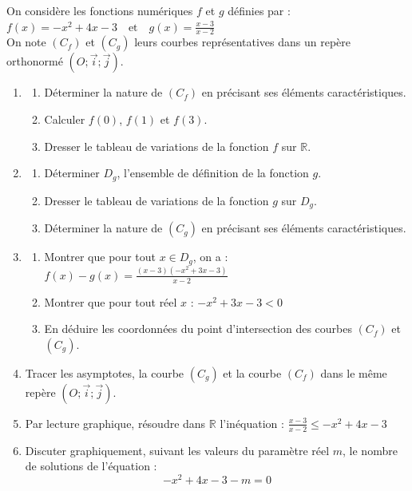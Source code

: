 \begin{Exercice}
On considère les fonctions numériques $f$ et $g$ définies par : \quad
$f(x) = -x^2 + 4x - 3  \quad \text{et} \quad  g(x) = \frac{x-3}{x-2}$
\vspace{0.2cm} \\
On note $(C_f)$ et $(C_g)$ leurs courbes représentatives dans un repère orthonormé $(O;\vec{i};\vec{j})$.

\begin{enumerate}
\item
\begin{enumerate}
    \item Déterminer la nature de $(C_f)$ en précisant ses éléments caractéristiques.
    \item Calculer $f(0)$, $f(1)$ et $f(3)$.
    \item Dresser le tableau de variations de la fonction $f$ sur $\mathbb{R}$.
\end{enumerate}
\item
\begin{enumerate}
    \item Déterminer $D_g$, l'ensemble de définition de la fonction $g$.
    \item Dresser le tableau de variations de la fonction $g$ sur $D_g$.
    \item Déterminer la nature de $(C_g)$ en précisant ses éléments caractéristiques.
\end{enumerate}
\item
\begin{enumerate}
    \item Montrer que pour tout $x \in D_g$, on a :
    $f(x) - g(x) = \frac{(x-3)(-x^2+3x-3)}{x-2}$
    \item Montrer que pour tout réel $x$ : $-x^2+3x-3 < 0 $
    \item En déduire les coordonnées du point d'intersection des courbes $(C_f)$ et $(C_g)$.
\end{enumerate}
\item Tracer les asymptotes, la courbe $(C_g)$ et la courbe $(C_f)$ dans le même repère $(O;\vec{i};\vec{j})$.
\item  Par lecture graphique, résoudre dans $\mathbb{R}$ l'inéquation :
$\frac{x-3}{x-2} \le -x^2 + 4x - 3$
\item  Discuter graphiquement, suivant les valeurs du paramètre réel $m$, le nombre de solutions de l'équation :$$-x^2 + 4x - 3 - m = 0$$
\end{enumerate}
\end{Exercice}
